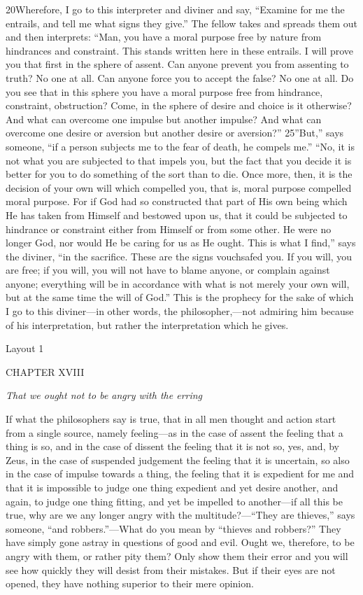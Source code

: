 20Wherefore, I go to this interpreter and diviner and say, ``Examine for me the entrails, and tell me what signs they give.'' The fellow takes and spreads them out and then interprets: ``Man, you have a moral purpose free by nature from hindrances and constraint. This stands written here in these entrails. I will prove you that first in the sphere of assent. Can anyone prevent you from assenting to truth? No one at all. Can anyone force you to accept the false? No one at all. Do you see that in this sphere you have a moral purpose free from hindrance, constraint, obstruction? Come, in the sphere of desire and choice is it otherwise? And what can overcome one impulse but another impulse? And what can overcome one desire or aversion but another desire or aversion?'' 25''But,'' says someone, ``if a person subjects me to the fear of death, he compels me.'' ``No, it is not what you are subjected to that impels you, but the fact that you decide it is better for you to do something of the sort than to die. Once more, then, it is the decision of your own will which compelled you, that is, moral purpose compelled moral purpose. For if God had so constructed that part of His own being which He has taken from Himself and bestowed upon us, that it could be subjected to hindrance or constraint either from Himself or from some other. He were no longer God, nor would He be caring for us as He ought. This is what I find,'' says the diviner, ``in the sacrifice. These are the signs vouchsafed you. If you will, you are free; if you will, you will not have to blame anyone, or complain against anyone; everything will be in accordance with what is not merely your own will, but at the same time the will of God.'' This is the prophecy for the sake of which I go to this diviner—in other words, the philosopher,—not admiring him because of his interpretation, but rather the interpretation which he gives.



Layout 1

CHAPTER XVIII

\emph{That we ought not to be angry with the erring}

If what the philosophers say is true, that in all men thought and action start from a single source, namely feeling—as in the case of assent the feeling that a thing is so, and in the case of dissent the feeling that it is not so, yes, and, by Zeus, in the case of suspended judgement the feeling that it is uncertain, so also in the case of impulse towards a thing, the feeling that it is expedient for me and that it is impossible to judge one thing expedient and yet desire another, and again, to judge one thing fitting, and yet be impelled to another—if all this be true, why are we any longer angry with the multitude?—``They are thieves,'' says someone, ``and robbers.''—What do you mean by ``thieves and robbers?'' They have simply gone astray in questions of good and evil. Ought we, therefore, to be angry with them, or rather pity them? Only show them their error and you will see how quickly they will desist from their mistakes. But if their eyes are not opened, they have nothing superior to their mere opinion.

